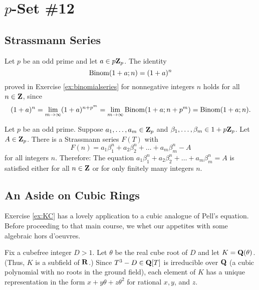 \chapter*{$p$-Set \#12}

\vspace{-0.25in}
\section*{Strassmann Series}

\begin{prob}\label{ex:binom2}
 Let $p$ be an odd prime and let $a \in p\mathbf{Z}_p$. The identity
\[ \mathrm{Binom}(1+a;n) = (1+a)^{n}\]
proved in Exercise \ref{ex:binomialseries} for nonnegative integers $n$ holds for all $n \in \mathbf{Z}$, since 
\[ (1+a)^{n} = \lim_{m\to\infty} (1+a)^{n+p^m} = \lim_{m\to\infty} \mathrm{Binom}(1+a;n+p^m) = \mathrm{Binom}(1+a;n).\]
\end{prob}

\begin{prob}[Skolem]\label{ex:KC} Let $p$ be an odd prime.  Suppose $a_1, \dots, a_m \in \mathbf{Z}_p$ and $\beta_1, \dots, \beta_m \in 1+p\mathbf{Z}_p$. Let $A \in \mathbf{Z}_p$. There is a Strassmann series $F(T)$ with 
\[ F(n) = a_1 \beta_1^{n} + a_2 \beta_2^{n} + \dots + a_m \beta_m^{n} - A \]
for all integers $n$. Therefore: The equation $a_1 \beta_1^{n} + a_2 \beta_2^{n} + \dots + a_m \beta_m^{n} = A$
is satisfied either for all $n \in \mathbf{Z}$ or for only finitely many integers $n$.
\end{prob}


\section*{An Aside on Cubic Rings}
Exercise \ref{ex:KC} has a lovely application to a cubic analogue of Pell's equation. Before proceeding to that main course, we whet our appetites with some algebraic hors d'oeuvres.


Fix a cubefree integer $D > 1$. Let $\theta$ be the real cube root of $D$ and let $K = \mathbf{Q}(\theta)$. (Thus, $K$ is a subfield of $\mathbf{R}$.) Since $T^3-D \in \mathbf{Q}[T]$ is irreducible over $\mathbf{Q}$ (a cubic polynomial with no roots in the ground field), each element of $K$ has a unique representation in the form $x+y\theta + z\theta^2$ for rational $x, y$, and $z$. 


